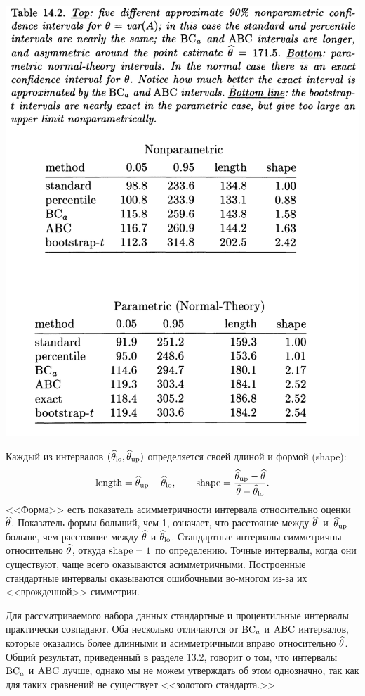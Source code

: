 \noindent
\begin{center}
\includegraphics[width=0.9\linewidth]{14/t142.png}
\end{center}
\setcounter{table}{2}
Каждый из интервалов $(\widehat{\theta}_{\text{lo}}, \widehat{\theta}_{\text{up}})$ определяется своей длиной и формой (shape):
\begin{equation}
	\text{length} = \widehat{\theta}_{\text{up}} - \widehat{\theta}_{\text{lo}}, \qquad \text{shape} = \frac{\widehat{\theta}_{\text{up}} - \widehat{\theta}}{\widehat{\theta} - \widehat{\theta}_{\text{lo}}}.
\end{equation}
<<Форма>> есть показатель асимметричности интервала относительно оценки $\widehat{\theta}$. Показатель формы больший, чем 1, означает, что расстояние между $\widehat{\theta}$~и~$\widehat{\theta}_{\text{up}}$ больше, чем расстояние между $\widehat{\theta}$ и $\widehat{\theta}_{\text{lo}}$. Стандартные интервалы симметричны относительно $\widehat{\theta}$, откуда $\text{shape} = 1$ по определению. Точные интервалы, когда они существуют, чаще всего оказываются асимметричными. Построенные стандартные интервалы оказываются ошибочными во-многом из-за их <<врожденной>> симметрии. 

Для рассматриваемого набора данных стандартные и процентильные интервалы практически совпадают. Оба несколько отличаются от $\mathrm{BC}_a$ и $\mathrm{ABC}$ интервалов, которые оказались более длинными и асимметричными вправо относительно $\widehat{\theta}$. Общий результат, приведенный в разделе 13.2, говорит о том, что интервалы $\mathrm{BC}_a$ и $\mathrm{ABC}$ лучше, однако мы не можем утверждать об этом однозначно, так как для таких сравнений не существует <<золотого стандарта.>>

